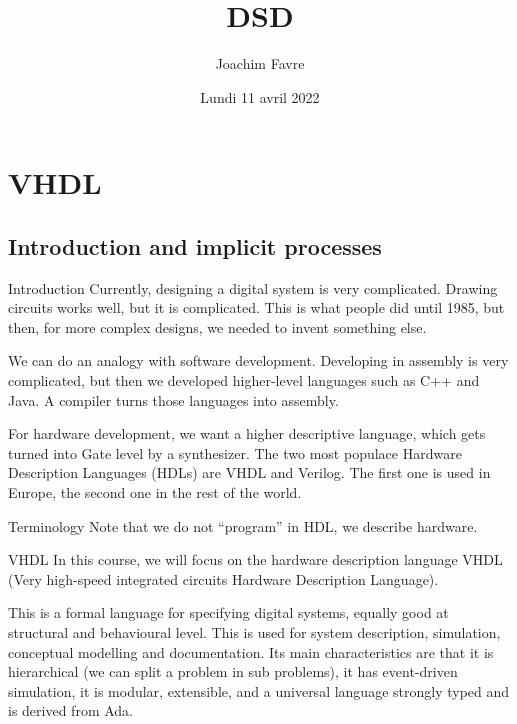 \documentclass[a4paper]{article}
\title{DSD}
\author{Joachim Favre}
\date{Lundi 11 avril 2022}
\begin{document}
\maketitle


\section{VHDL}
\subsection{Introduction and implicit processes}

\begin{parag}{Introduction}
    Currently, designing a digital system is very complicated. Drawing circuits works well, but it is complicated. This is what people did until 1985, but then, for more complex designs, we needed to invent something else.

    We can do an analogy with software development. Developing in assembly is very complicated, but then we developed higher-level languages such as C++ and Java. A compiler turns those languages into assembly.

    For hardware development, we want a higher descriptive language, which gets turned into Gate level by a synthesizer. The two most populace Hardware Description Languages (HDLs) are VHDL and Verilog. The first one is used in Europe, the second one in the rest of the world.

    \begin{subparag}{Terminology}
        Note that we do not ``program'' in HDL, we describe hardware.
    \end{subparag}
\end{parag}

\begin{parag}{VHDL}
    In this course, we will focus on the hardware description language VHDL (Very high-speed integrated circuits Hardware Description Language).

    This is a formal language for specifying digital systems, equally good at structural and behavioural level. This is used for system description, simulation, conceptual modelling and documentation. Its main characteristics are that it is hierarchical (we can split a problem in sub problems), it has event-driven simulation, it is modular, extensible, and a universal language strongly typed and is derived from Ada.
\end{parag}
\end{document}
